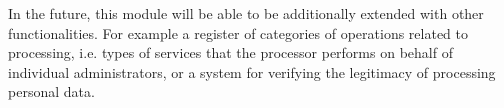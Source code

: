 \documentclass[en, noamssymb]{mgr}
\begin{document}
\indent In the future, this module will be able to be additionally extended with other functionalities. For example a register of categories of operations related to processing, i.e. types of services that the processor performs on behalf of individual administrators, or a system for verifying the legitimacy of processing personal data.


\listoffigures
\end{document}

